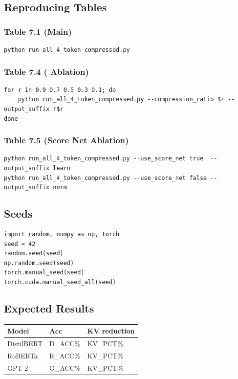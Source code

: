 \subsection{Reproducing Tables}

\subsubsection{Table 7.1 (Main)}
\begin{lstlisting}
python run_all_4_token_compressed.py
\end{lstlisting}

\subsubsection{Table 7.4 (  Ablation)}
\begin{lstlisting}
for r in 0.9 0.7 0.5 0.3 0.1; do
    python run_all_4_token_compressed.py --compression_ratio $r --output_suffix r$r
done
\end{lstlisting}

\subsubsection{Table 7.5 (Score Net Ablation)}
\begin{lstlisting}
python run_all_4_token_compressed.py --use_score_net true  --output_suffix learn
python run_all_4_token_compressed.py --use_score_net false --output_suffix norm
\end{lstlisting}

\subsection{Seeds}

\begin{lstlisting}
import random, numpy as np, torch
seed = 42
random.seed(seed)
np.random.seed(seed)
torch.manual_seed(seed)
torch.cuda.manual_seed_all(seed)
\end{lstlisting}

\subsection{Expected Results}

\begin{table}[H]
\centering
\small
\begin{tabular}{lll}
\toprule
\textbf{Model} & \textbf{Acc} & \textbf{KV reduction} \\
\midrule
DistilBERT & {{D\_ACC}}\% & {{KV\_PCT}}\% \\
RoBERTa & {{R\_ACC}}\% & {{KV\_PCT}}\% \\
GPT-2 & {{G\_ACC}}\% & {{KV\_PCT}}\% \\
\bottomrule
\end{tabular}
\end{table}

